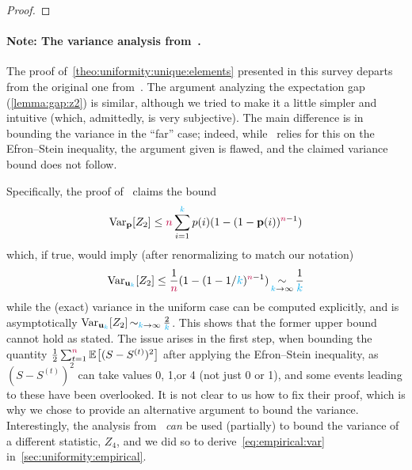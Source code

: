 \begin{proof}
\tbc
\end{proof}

\paragraph{Note: The variance analysis from~\citet{Paninski08}.}
The proof of~\cref{theo:uniformity:unique:elements} presented in this survey departs from the original one from~\citet{Paninski08}. The argument analyzing the expectation gap (\cref{lemma:gap:z2}) is similar, although we tried to make it a little simpler and intuitive (which, admittedly, is very subjective). The main difference is in bounding the variance in the ``far'' case; indeed, while~\citep{Paninski08} relies for this on the Efron--Stein inequality, the argument given is flawed, and the claimed variance bound does not follow.

Specifically, the proof of~\citet[Lemma~2]{Paninski08} claims the bound
\[
  \operatorname{Var}_{\mathbf{p}}[Z_2] \leq {\textcolor{purple}{n}} \sum_{i=1}^{\textcolor{cyan}{k}} p(i)(1-(1-\mathbf{p}(i))^{{\textcolor{purple}{n}}-1})
\]
which, if true, would imply (after renormalizing to match our notation)
\[
  \operatorname{Var}_{\mathbf{u}_{\textcolor{cyan}{k}}}[Z_2] \leq \frac{1}{{\textcolor{purple}{n}}}(1-(1-1/{\textcolor{cyan}{k}})^{{\textcolor{purple}{n}}-1}) \operatorname*{\sim}_{{\textcolor{cyan}{k}}\to \infty} \frac{1}{{\textcolor{cyan}{k}}}
\]
while the (exact) variance in the uniform case can be computed explicitly, and is asymptotically $\operatorname{Var}_{\mathbf{u}_{\textcolor{cyan}{k}}}[Z_2] \operatorname*{\sim}_{{\textcolor{cyan}{k}}\to \infty} \frac{2}{{\textcolor{cyan}{k}}}$. 
This shows that the former upper bound cannot hold as stated. The issue arises in the first step, when bounding 
the quantity $\frac{1}{2} \sum_{t=1}^\ns \bEE{(S-S^{(t)})^2}$ after applying the Efron--Stein inequality, as $(S-S^{(t)})^2$ can take values 0, 1,or 4 (not just 0 or 1), and some events leading to these have been overlooked. It is not clear to us how to fix their proof, which is why we chose to provide an alternative argument to bound the variance. Interestingly, the analysis from~\citet[Lemma~2]{Paninski08} \emph{can} be used (partially) to bound the variance of a different statistic, $Z_4$, and we did so to derive~\cref{eq:empirical:var} in~\cref{sec:uniformity:empirical}.

